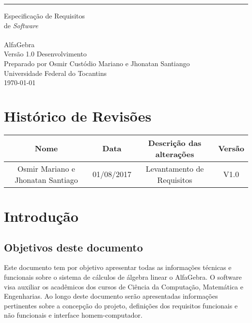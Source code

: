 \documentclass{scrreprt}
\date{}
\def\myversion{1.0 }
\begin{document}
\begin{flushright}
    \rule{16cm}{5pt}\vskip1cm
    \begin{bfseries}
        \Huge{Especificação de Requisitos\\ de \textit{Software}}\\ 
        \vspace{1.9cm}
        \\
        \vspace{1.9cm}
        AlfaGebra\\
        \vspace{1.9cm}
        \LARGE{Versão \myversion Desenvolvimento}\\
        \vspace{1.9cm}
        Preparado por Osmir Custódio Mariano e Jhonatan Santiango\\
        \vspace{1.9cm}
        Universidade Federal do Tocantins\\
        \vspace{1.9cm}
        \today\\
    \end{bfseries}
\end{flushright}

\tableofcontents


\chapter*{Histórico de Revisões}

\begin{center}
    \begin{tabular}{|c|c|c|c|}
        \hline
	    Nome & Data & Descrição das alterações & Versão\\
        \hline
	    Osmir Mariano e Jhonatan Santiago & 01/08/2017 & Levantamento de Requisitos & V1.0\\
        \hline
    \end{tabular}
\end{center}

\chapter{Introdução}

\section{Objetivos deste documento}
Este documento tem por objetivo apresentar todas as informações técnicas e funcionais sobre o sistema de cálculos de álgebra linear o AlfaGebra. O software visa auxiliar os acadêmicos dos cursos de Ciência da Computação, Matemática e Engenharias. Ao longo deste documento serão apresentadas informações pertinentes sobre a concepção do projeto, definições dos requisitos funcionais e não funcionais e interface homem-computador.
\end{document}
